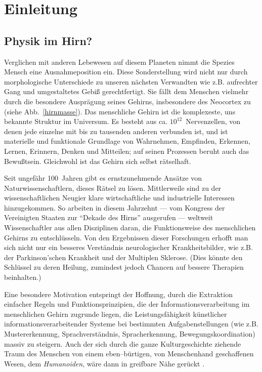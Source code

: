\section{Einleitung}
\label{einleitung}
\thispagestyle{plain}

\subsection{Physik im Hirn?}

Verglichen mit anderen Lebewesen auf diesem Planeten nimmt die Spezies
Mensch eine Ausnahmeposition ein. Diese Sonderstellung wird nicht nur
durch morphologische Unterschiede zu unseren nächsten Verwandten wie
z.B. aufrechter Gang und umgestaltetes Gebiß gerechtfertigt. Sie fällt
dem Menschen vielmehr durch die besondere Ausprägung seines Gehirns,
insbesondere des Neocortex zu (siehe Abb.~\ref{hirnmasse}). Das
menschliche Gehirn ist die komplexeste, uns bekannte Struktur im Universum.
Es besteht aus ca. $10^{12}$~Nervenzellen, von denen jede einzelne mit bis
zu tausenden anderen verbunden ist, und ist materielle und funktionale
Grundlage von Wahrnehmen, Empfinden, Erkennen, Lernen, Erinnern, Denken und
Mitteilen; auf seinen Prozessen beruht auch das Bewußtsein. Gleichwohl ist
das Gehirn sich selbst rätselhaft.

Seit ungefähr 100~Jahren gibt es ernstzunehmende Ansätze von
Naturwissenschaftlern, dieses Rätsel zu lösen. Mittlerweile sind zu der
wissenschaftlichen Neugier klare wirtschaftliche und industrielle
Interessen hinzugekommen. So arbeiten in diesem Jahrzehnt --- vom Kongress
der Vereinigten Staaten zur ``Dekade des Hirns'' ausgerufen --- weltweit
Wissenschaftler aus allen Disziplinen daran, die Funktionsweise des
menschlichen Gehirns zu entschlüsseln. Von den Ergebnissen dieser
Forschungen erhofft man sich nicht nur ein besseres Verständnis
neurologischer Krankheitsbilder, wie z.B. der Parkinson'schen Krankheit und
der Multiplen Sklerose. (Dies könnte den Schlüssel zu deren Heilung,
zumindest jedoch Chancen auf bessere Therapien beinhalten.)

Eine besondere Motivation entspringt der Hoffnung, durch die Extraktion
einfacher Regeln und Funktionsprinzipien, die der Informationsverarbeitung
im menschlichen Gehirn zugrunde liegen, die Leistungsfähigkeit
künstlicher informationsverarbeitender Systeme bei bestimmten
Aufgabenstellungen (wie z.B. Mustererkennung, Sprachverständnis,
Spracherkennung, Bewegungskoordination) massiv zu steigern. Auch der sich
durch die ganze Kulturgeschichte ziehende Traum des Menschen von einem
eben--bürtigen, von Menschenhand geschaffenen Wesen, dem \emph{Humanoiden},
wäre dann in greifbare Nähe gerückt \parencite[zum Stand der Dinge siehe z.B.][]{brooks:1990}.

